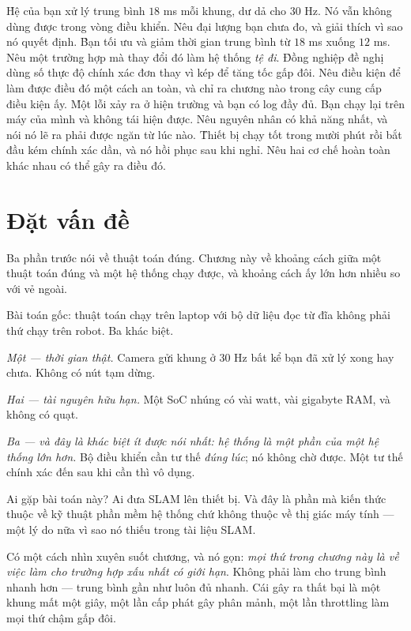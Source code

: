 \documentclass[../../vslam.tex]{subfiles}
\begin{document}
\begin{khoigoi}
\h{Hệ của bạn xử lý trung bình \(18\) ms mỗi khung, dư dả cho \(30\) Hz. Nó vẫn không dùng được trong vòng điều khiển. Nêu đại lượng bạn chưa đo, và giải thích vì sao nó quyết định.}
\h{Bạn tối ưu và giảm thời gian trung bình từ \(18\) ms xuống \(12\) ms. Nêu một trường hợp mà thay đổi đó làm hệ thống \emph{tệ đi}.}
\h{Đồng nghiệp đề nghị dùng số thực độ chính xác đơn thay vì kép để tăng tốc gấp đôi. Nêu điều kiện để làm được điều đó một cách an toàn, và chỉ ra chương nào trong cây cung cấp điều kiện ấy.}
\h{Một lỗi xảy ra ở hiện trường và bạn có log đầy đủ. Bạn chạy lại trên máy của mình và không tái hiện được. Nêu nguyên nhân có khả năng nhất, và nói nó lẽ ra phải được ngăn từ lúc nào.}
\h{Thiết bị chạy tốt trong mười phút rồi bắt đầu kém chính xác dần, và nó hồi phục sau khi nghỉ. Nêu hai cơ chế hoàn toàn khác nhau có thể gây ra điều đó.}
\end{khoigoi}

\section{Đặt vấn đề}

Ba phần trước nói về thuật toán đúng. Chương này về khoảng cách giữa một thuật toán đúng và một hệ thống chạy được, và khoảng cách ấy lớn hơn nhiều so với vẻ ngoài.

Bài toán gốc: thuật toán chạy trên laptop với bộ dữ liệu đọc từ đĩa không phải thứ chạy trên robot. Ba khác biệt.

\emph{Một --- thời gian thật.} Camera gửi khung ở \(30\) Hz bất kể bạn đã xử lý xong hay chưa. Không có nút tạm dừng.

\emph{Hai --- tài nguyên hữu hạn.} Một SoC nhúng có vài watt, vài gigabyte RAM, và không có quạt.

\emph{Ba --- và đây là khác biệt ít được nói nhất: hệ thống là một phần của một hệ thống lớn hơn.} Bộ điều khiển cần tư thế \emph{đúng lúc}; nó không chờ được. Một tư thế chính xác đến sau khi cần thì vô dụng.

Ai gặp bài toán này? Ai đưa SLAM lên thiết bị. Và đây là phần mà kiến thức thuộc về kỹ thuật phần mềm hệ thống chứ không thuộc về thị giác máy tính --- một lý do nữa vì sao nó thiếu trong tài liệu SLAM.

Có một cách nhìn xuyên suốt chương, và nó gọn: \emph{mọi thứ trong chương này là về việc làm cho trường hợp xấu nhất có giới hạn}. Không phải làm cho trung bình nhanh hơn --- trung bình gần như luôn đủ nhanh. Cái gây ra thất bại là một khung mất một giây, một lần cấp phát gây phân mảnh, một lần throttling làm mọi thứ chậm gấp đôi.
\end{document}
